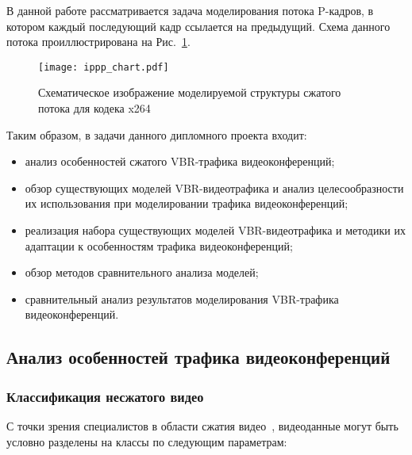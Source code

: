 В данной работе рассматривается задача моделирования потока
P-кадров, в котором каждый последующий кадр ссылается на
предыдущий. Схема данного потока проиллюстрирована на Рис.~\ref{fig:ippp_frames}.

\begin{figure}[h]
    \begin{center}
        \texttt{[image: ippp\_chart.pdf]}
    \end{center}
    \caption{Схематическое изображение моделируемой структуры сжатого потока
    для кодека x264}
    \label{fig:ippp_frames}
\end{figure}

Таким образом, в задачи данного дипломного проекта входит:

\begin{itemize}
    \item анализ особенностей сжатого VBR-трафика видеоконференций;
    \item обзор существующих моделей VBR-видеотрафика и анализ
        целесообразности их использования при моделировании
        трафика видеоконференций;
    \item реализация набора существующих моделей VBR-видеотрафика
        и методики их адаптации к особенностям трафика видеоконференций;
    \item обзор методов сравнительного анализа моделей;
    \item сравнительный анализ результатов моделирования VBR-трафика
        видеоконференций.
\end{itemize}


\subsection{Анализ особенностей трафика видеоконференций}
\subsubsection{Классификация несжатого видео}
\hspace{3pt}

С точки зрения специалистов в области сжатия видео~\cite{},
видеоданные могут быть условно разделены на классы по
следующим параметрам:

